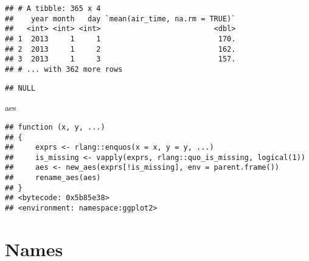 \documentclass[]{book}
\newenvironment{Shaded}{\begin{snugshade}}{\end{snugshade}}
\newcommand{\DataTypeTok}[1]{\textcolor[rgb]{0.13,0.29,0.53}{#1}}
\newcommand{\KeywordTok}[1]{\textcolor[rgb]{0.13,0.29,0.53}{\textbf{#1}}}
\newcommand{\NormalTok}[1]{#1}
\newcommand{\OperatorTok}[1]{\textcolor[rgb]{0.81,0.36,0.00}{\textbf{#1}}}
\newcommand{\OtherTok}[1]{\textcolor[rgb]{0.56,0.35,0.01}{#1}}
\newcommand{\StringTok}[1]{\textcolor[rgb]{0.31,0.60,0.02}{#1}}
\begin{document}
\begin{Shaded}
\end{Shaded}

\begin{verbatim}
## # A tibble: 365 x 4
##    year month   day `mean(air_time, na.rm = TRUE)`
##   <int> <int> <int>                          <dbl>
## 1  2013     1     1                           170.
## 2  2013     1     2                           162.
## 3  2013     1     3                           157.
## # ... with 362 more rows
\end{verbatim}

\begin{Shaded}
\end{Shaded}

\begin{verbatim}
## NULL
\end{verbatim}

\begin{Shaded}
\begin{Highlighting}[]
\NormalTok{aes}
\end{Highlighting}
\end{Shaded}

\begin{verbatim}
## function (x, y, ...) 
## {
##     exprs <- rlang::enquos(x = x, y = y, ...)
##     is_missing <- vapply(exprs, rlang::quo_is_missing, logical(1))
##     aes <- new_aes(exprs[!is_missing], env = parent.frame())
##     rename_aes(aes)
## }
## <bytecode: 0x5b85e38>
## <environment: namespace:ggplot2>
\end{verbatim}

\hypertarget{names-1}{%
\section{Names}\label{names-1}}
\end{document}

